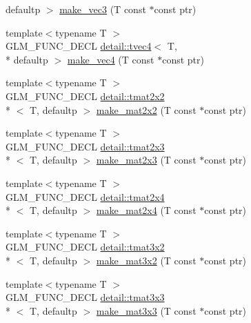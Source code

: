\begin{DoxyCompactItemize}
defaultp $>$ \hyperlink{group__gtc__type__ptr_gad91a6a0fe324630b151208703a1591ed}{make\-\_\-vec3} (T const $\ast$const ptr)
\item 
{\footnotesize template$<$typename T $>$ }\\G\-L\-M\-\_\-\-F\-U\-N\-C\-\_\-\-D\-E\-C\-L \hyperlink{structglm_1_1detail_1_1tvec4}{detail\-::tvec4}$<$ T, \\*
defaultp $>$ \hyperlink{group__gtc__type__ptr_ga1b9e0d9ca48d79ba87edc121c1872c44}{make\-\_\-vec4} (T const $\ast$const ptr)
\item 
{\footnotesize template$<$typename T $>$ }\\G\-L\-M\-\_\-\-F\-U\-N\-C\-\_\-\-D\-E\-C\-L \hyperlink{structglm_1_1detail_1_1tmat2x2}{detail\-::tmat2x2}\\*
$<$ T, defaultp $>$ \hyperlink{group__gtc__type__ptr_ga860d529f631ea6f9a0e510491d29a8ac}{make\-\_\-mat2x2} (T const $\ast$const ptr)
\item 
{\footnotesize template$<$typename T $>$ }\\G\-L\-M\-\_\-\-F\-U\-N\-C\-\_\-\-D\-E\-C\-L \hyperlink{structglm_1_1detail_1_1tmat2x3}{detail\-::tmat2x3}\\*
$<$ T, defaultp $>$ \hyperlink{group__gtc__type__ptr_gadef48cd950566f23a4b1e47127ee478c}{make\-\_\-mat2x3} (T const $\ast$const ptr)
\item 
{\footnotesize template$<$typename T $>$ }\\G\-L\-M\-\_\-\-F\-U\-N\-C\-\_\-\-D\-E\-C\-L \hyperlink{structglm_1_1detail_1_1tmat2x4}{detail\-::tmat2x4}\\*
$<$ T, defaultp $>$ \hyperlink{group__gtc__type__ptr_ga174a43e8913682834de9cd918e36df25}{make\-\_\-mat2x4} (T const $\ast$const ptr)
\item 
{\footnotesize template$<$typename T $>$ }\\G\-L\-M\-\_\-\-F\-U\-N\-C\-\_\-\-D\-E\-C\-L \hyperlink{structglm_1_1detail_1_1tmat3x2}{detail\-::tmat3x2}\\*
$<$ T, defaultp $>$ \hyperlink{group__gtc__type__ptr_gaa40868af4de8c5ed5470fdcc9985dbfc}{make\-\_\-mat3x2} (T const $\ast$const ptr)
\item 
{\footnotesize template$<$typename T $>$ }\\G\-L\-M\-\_\-\-F\-U\-N\-C\-\_\-\-D\-E\-C\-L \hyperlink{structglm_1_1detail_1_1tmat3x3}{detail\-::tmat3x3}\\*
$<$ T, defaultp $>$ \hyperlink{group__gtc__type__ptr_gaf8ba0a0a523423ae1149a1c2d90eb337}{make\-\_\-mat3x3} (T const $\ast$const ptr)
\item 

\end{DoxyCompactItemize}
